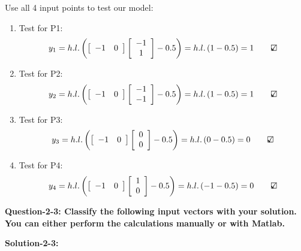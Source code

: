 Use all 4 input points to test our model:
\begin{enumerate}
    \item Test for P1:
    \[{y_1} = h.l.\left( {\left[ {\begin{array}{*{20}{c}}
-1&0
\end{array}} \right]\left[ {\begin{array}{*{20}{c}}
{ - 1}\\
1
\end{array}} \right] -0.5} \right) = h.l.\left( { 1 -0.5} \right) = 1 \qquad \text{\rlap{$\checkmark$}}\square\] 

\item Test for P2:
\[{y_2} = h.l.\left( {\left[ {\begin{array}{*{20}{c}}
-1&0
\end{array}} \right]\left[ {\begin{array}{*{20}{c}}
{ - 1}\\
{ - 1}
\end{array}} \right] -0.5} \right) = h.l.\left( {  1 -0.5} \right) = 1\qquad \text{\rlap{$\checkmark$}}\square\] 


\item Test for P3:
\[{y_3} = h.l.\left( {\left[ {\begin{array}{*{20}{c}}
{ - 1}&0
\end{array}} \right]\left[ {\begin{array}{*{20}{c}}
0\\
0
\end{array}} \right]  - 0.5} \right) = h.l.\left( { 0 - 0.5} \right) = 0\qquad {\rlap{$\checkmark$}}\square\]

\item Test for P4:
\[{y_4} = h.l.\left( {\left[ {\begin{array}{*{20}{c}}
-1&0
\end{array}} \right]\left[ {\begin{array}{*{20}{c}}
1\\
0
\end{array}} \right] - 0.5} \right) = h.l.\left( { -1 - 0.5} \right) = 0\qquad {\rlap{$\checkmark$}}\square\]
\end{enumerate}

\textbf{Question-2-3: Classify the following input vectors with your solution. You can either perform
the calculations manually or with Matlab.}


\textbf{Solution-2-3:}

